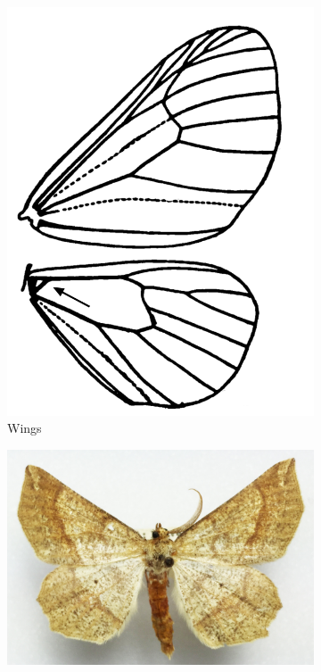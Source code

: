 \documentclass[letterpaper, 11pt]{article}
\begin{document}
\begin{figure}[ht!]
    \centering
    \begin{subfigure}[ht!]{0.3\textwidth}
        \includegraphics[width=\textwidth]{GeometridWings}
        \caption{Wings \citep[][Fig. 20]{comstock1893evolution}}
        \label{fig:geometrid1}
    \end{subfigure}
    \hfill %
    \begin{subfigure}[ht!]{0.48\textwidth}
        \includegraphics[width=\textwidth]{GeometridHabitus}

\end{subfigure}
\end{figure}
\end{document}
